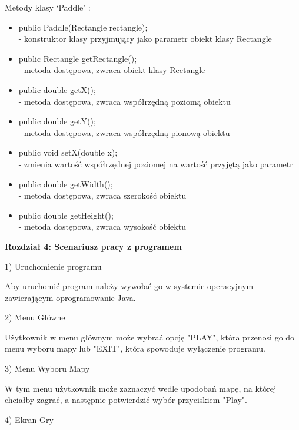 \documentclass[a4paper]{article}
\begin{document}
Metody klasy ‘Paddle’ :
\begin{itemize}
\item public Paddle(Rectangle rectangle);\\
- konstruktor klasy przyjmujący jako parametr obiekt klasy Rectangle
    
\item public Rectangle getRectangle();\\
- metoda dostępowa, zwraca obiekt klasy Rectangle
    
\item public double getX();\\
- metoda dostępowa, zwraca współrzędną poziomą obiektu

\item public double getY();\\
- metoda dostępowa, zwraca współrzędną pionową obiektu

\item public void setX(double x);\\
- zmienia wartość współrzędnej poziomej na wartość przyjętą jako parametr


\item public double getWidth();\\
- metoda dostępowa, zwraca szerokość obiektu

\item public double getHeight();\\
- metoda dostępowa, zwraca wysokość obiektu
\end{itemize}

\bigskip
\textbf{Rozdzia{\l} 4: Scenariusz pracy z programem}

1) Uruchomienie programu

Aby uruchomić program należy wywołać go w systemie operacyjnym zawierającym oprogramowanie Java.
\bigskip

2) Menu Główne

Użytkownik w menu głównym może wybrać opcję "PLAY", która przenosi go do menu wyboru mapy lub "EXIT", która spowoduje wyłączenie programu.
\bigskip

3) Menu Wyboru Mapy

W tym menu użytkownik może zaznaczyć wedle upodobań mapę, na której chciałby zagrać, a następnie potwierdzić wybór przyciskiem "Play".
\bigskip

4) Ekran Gry
\end{document}
